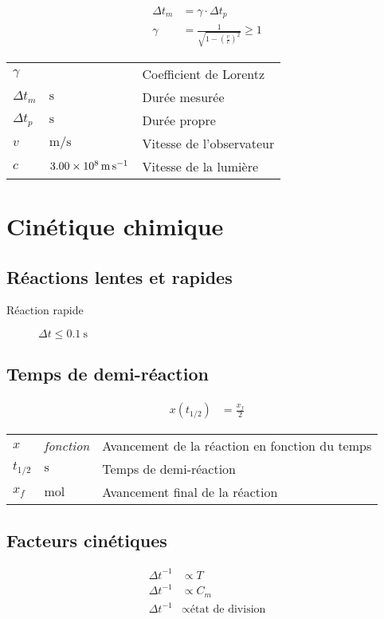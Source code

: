 \documentclass{article}
\newcommand{\deftable}[2]{%
\begin{table}[h]
    \centering
    \begin{tabular}{llp{100mm}}%
        #1
    \end{tabular}
    \label{tab:#2_units}
\end{table}%
}
\newcommand{\deftablevar}[3]{%
    $#1$ & $\si{#2}$ & #3 \\
}
\newcommand{\deftableobj}[3]{%
    $#1$ & \textit{#2} & #3 \\
}
\begin{document}
\begin{equation*}
    \begin{split}
        \Delta t_m &= \gamma \cdot \Delta t_p \\
	\gamma &= \frac{1}{\sqrt{1-(\frac{v}{c})^2}} \geq 1
    \end{split}
\end{equation*}

\deftable{
    \deftableobj{\gamma}{}{Coefficient de Lorentz}
    \deftablevar{\Delta t_m}{\second}{Durée mesurée}
    \deftablevar{\Delta t_p}{\second}{Durée propre}
    \deftablevar{v}{\meter\per\second}{Vitesse de l'observateur}
    \deftableobj{c}{$\SI{3.00E8}{\meter\per\second}$}{Vitesse de la lumière}
}{coefficient_de_lorentz}

\newpage\section{Cinétique chimique}

\subsection{Réactions lentes et rapides}
\begin{description}
    \item[Réaction rapide] $\Delta t \leq \SI{0.1}{\second}$
\end{description}
\subsection{Temps de demi-réaction}
\begin{equation*}
    \begin{split}
	x(t_{1/2}) &= \frac{x_f}{2}
    \end{split}
\end{equation*}
\deftable{
    \deftableobj{x}{fonction}{Avancement de la réaction en fonction du temps}
    \deftablevar{t_{1/2}}{\second}{Temps de demi-réaction}
    \deftablevar{x_f}{\mol}{Avancement final de la réaction}
}{temps_de_demi_reaction}

\subsection{Facteurs cinétiques}

\begin{equation*}
    \begin{split}
	{\Delta t}^{-1} &\propto T \\
	{\Delta t}^{-1} &\propto C_m \\
	{\Delta t}^{-1} &\propto \text{état de division}
    \end{split}
\end{equation*}
\end{document}
